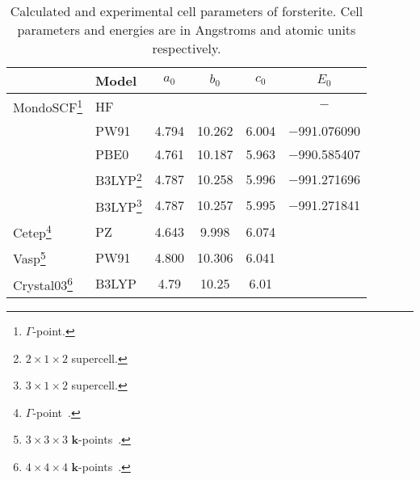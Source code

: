 \documentclass[pra,twocolumn,twocolumngrid,superbib]{revtex4} %
\begin{document}
\begin{table}[t]
  \centering
  \caption{\protect
    Calculated and experimental cell parameters of forsterite.
    Cell parameters and energies are in Angstroms and atomic units respectively.
  }\label{Tab:Forsterite}
  \begin{tabular}{llcccc}
  \toprule
  & Model & $a_0$ & $b_0$ & $c_0$ & $E_0$ \\
  \hline
    {\sc MondoSCF}\footnote[1]{$\Gamma$-point.}
    & HF     &  &  &  & $-$ \\%
    & PW91   & 4.794 & 10.262 & 6.004 & $-$991.076090 \\%
    & PBE0   & 4.761 & 10.187 & 5.963 & $-$990.585407 \\%
    & B3LYP\footnote[2]{$2\times 1\times 2$ supercell.} %
             & 4.787 & 10.258 & 5.996 & $-$991.271696 \\%
    & B3LYP\footnote[3]{$3\times 1\times 2$ supercell.} %
             & 4.787 & 10.257 & 5.995 & $-$991.271841 \\%
  \hline
    {\sc Cetep}\footnote[4]{$\Gamma$-point~\cite{JBrodholt96}.}
    & PZ     & 4.643 & 9.998  & 6.074  & \\
    {\sc Vasp}\footnote[5]{$3\times 3\times 3$ $\mathbf{k}$-points~\cite{PJochym04}.}
    & PW91   & 4.800 & 10.306 & 6.041 & \\
    {\sc Crystal03}\footnote[6]{$4\times 4\times 4$ $\mathbf{k}$-points~\cite{YNoel06}.}
    & B3LYP  & 4.79  & 10.25  & 6.01  & \\
  \hline

\end{tabular}
\end{table}
\end{document}
